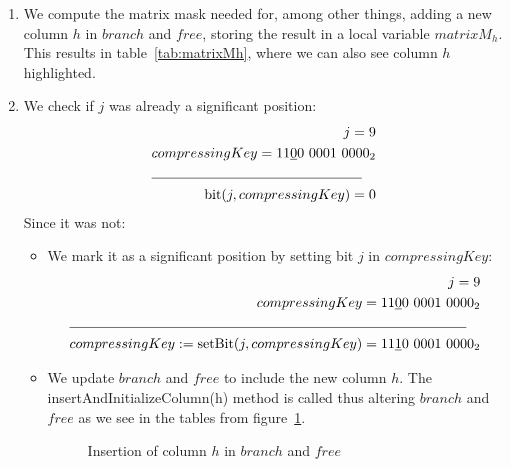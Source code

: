 \begin{enumerate}
    \item
    We compute the matrix mask needed for, among other things, adding a new column $h$ in $branch$ and $free$, storing the result in a local variable $matrixM_h$. This results in table~\ref{tab:matrixMh}, where we can also see column $h$ highlighted.
    \begin{table}[H]
    \centering
    
    \caption[{\ttfamily matrixM(1)}]{$matrixM_h$}
    \label{tab:matrixMh}
    \end{table}
    
    \item
    We check if $j$ was already a significant position:
    \begin{align*}
        j = 9 \\
        compressingKey = 11\underline{0}0\ 0001\ 0000_2 \\
        \cline{1-2}
        \text{bit}(j, compressingKey) = 0
    \end{align*}
    Since it was not:
    \begin{itemize}
        \item
        We mark it as a significant position by setting bit $j$ in $compressingKey$:
        \begin{align*}
            j = 9 \\
            compressingKey = 11\underline{0}0\ 0001\ 0000_2\\
            \cline{1-2}
             compressingKey := \text{setBit}(j, compressingKey) = 11\underline{1}0\ 0001\ 0000_2
        \end{align*}
        
        \item
        We update $branch$ and $free$ to include the new column $h$. The {\ttfamily insertAndInitializeColumn(h)} method is called thus altering $branch$ and $free$ as we see in the tables from figure~\ref{fig:branchAndFreeInsertHcolumn}.
        \begin{figure}[H]
        \centering
        
        \caption[Example of $branch$ and $free$ after insertion of column at position $1$]{Insertion of column $h$ in $branch$ and $free$}
        \label{fig:branchAndFreeInsertHcolumn}
        \end{figure}
    \end{itemize}


\end{enumerate}
